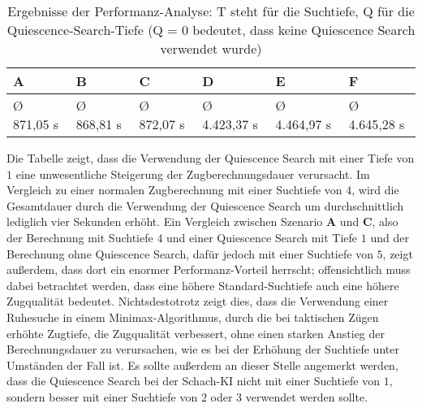 \begin{table}[H]
	\centering
	\begin{tabular}{|l|l|l|l|l|l|}
		\hline
		\textbf{A} & \textbf{B} & \textbf{C} & D            & E            & F            \\ \hline
		Ø 871,05 s & Ø 868,81 s & Ø 872,07 s & Ø 4.423,37 s & Ø 4.464,97 s & Ø 4.645,28 s \\ \hline
		\end{tabular}
	\caption{Ergebnisse der Performanz-Analyse: T steht für die Suchtiefe, Q für die Quiescence-Search-Tiefe (Q = 0 bedeutet, dass keine Quiescence Search verwendet wurde)}
	\label{tab:performance}
\end{table}

Die Tabelle zeigt, dass die Verwendung der Quiescence Search mit einer Tiefe von $1$ eine unwesentliche Steigerung der Zugberechnungsdauer verursacht. Im Vergleich zu einer normalen Zugberechnung mit einer Suchtiefe von $4$, wird die Gesamtdauer durch die Verwendung der Quiescence Search um durchschnittlich lediglich vier Sekunden erhöht. Ein Vergleich zwischen Szenario \textbf{A} und \textbf{C}, also der Berechnung mit Suchtiefe $4$ und einer Quiescence Search mit Tiefe $1$ und der Berechnung ohne Quiescence Search, dafür jedoch mit einer Suchtiefe von $5$, zeigt außerdem, dass dort ein enormer Performanz-Vorteil herrscht; offensichtlich muss dabei betrachtet werden, dass eine höhere Standard-Suchtiefe auch eine höhere Zugqualität bedeutet. Nichtsdestotrotz zeigt dies, dass die Verwendung einer Ruhesuche in einem Minimax-Algorithmus, durch die bei taktischen Zügen erhöhte Zugtiefe, die Zugqualität verbessert, ohne einen starken Anstieg der Berechnungsdauer zu verursachen, wie es bei der Erhöhung der Suchtiefe unter Umständen der Fall ist. Es sollte außerdem an dieser Stelle angemerkt werden, dass die Quiescence Search bei der Schach-KI nicht mit einer Suchtiefe von $1$, sondern besser mit einer Suchtiefe von $2$ oder $3$ verwendet werden sollte. 